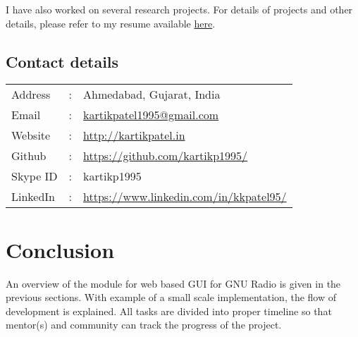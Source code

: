 \documentclass[a4paper, 11pt]{article}
\begin{document}
I have also worked on several research projects. For details of projects and other details, please refer to my resume available \href{http://kartikpatel.in/Backup/Documents/CV.pdf}{here}.

\subsection*{Contact details}
\begin{tabular}{lcl}
Address&:& Ahmedabad, Gujarat, India\\
Email&:&\href{mailto:kartikpatel1995@gmail.com}{kartikpatel1995@gmail.com} \\
Website&:& \url{http://kartikpatel.in}\\
Github&:&\url{https://github.com/kartikp1995/}\\
Skype ID & : & kartikp1995\\
LinkedIn & : & \url{https://www.linkedin.com/in/kkpatel95/}
\end{tabular}

\section{Conclusion}
An overview of the module for web based GUI for GNU Radio is given in the previous sections. With example of a small scale implementation, the flow of development is explained. All tasks are divided into proper timeline so that mentor(s) and community can track the progress of the project.



\end{document}
